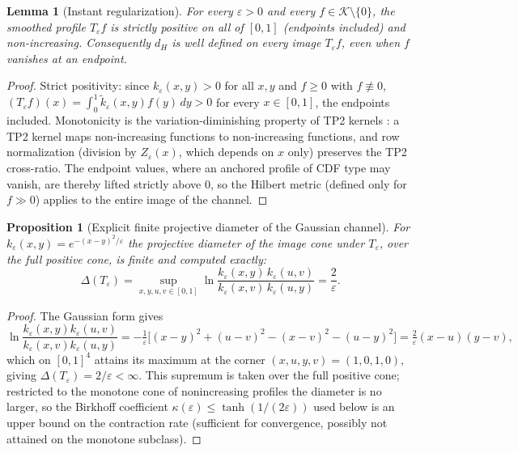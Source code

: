 \documentclass[11pt]{article}
\theoremstyle{plain}
\newtheorem{lemma}[theorem]{Lemma}
\newtheorem{proposition}[theorem]{Proposition}
\theoremstyle{definition}
\theoremstyle{remark}
\begin{document}
\begin{lemma}[Instant regularization]\label{lem:strictpos}
For every $\varepsilon>0$ and every $f\in\mathcal K\setminus\{0\}$, the smoothed profile $T_\varepsilon f$ is strictly positive on all of $[0,1]$ (endpoints included) and non-increasing. Consequently $d_H$ is well defined on every image $T_\varepsilon f$, even when $f$ vanishes at an endpoint.
\end{lemma}
\begin{proof}
Strict positivity: since $k_\varepsilon(x,y)>0$ for all $x,y$ and $f\ge0$ with $f\not\equiv0$, $(T_\varepsilon f)(x)=\int_0^1\tilde k_\varepsilon(x,y)f(y)\,dy>0$ for every $x\in[0,1]$, the endpoints included. Monotonicity is the variation-diminishing property of TP2 kernels \citep{karlin1968}: a TP2 kernel maps non-increasing functions to non-increasing functions, and row normalization (division by $Z_\varepsilon(x)$, which depends on $x$ only) preserves the TP2 cross-ratio. The endpoint values, where an anchored profile of CDF type may vanish, are thereby lifted strictly above $0$, so the Hilbert metric (defined only for $f\gg0$) applies to the entire image of the channel.
\end{proof}

\begin{proposition}[Explicit finite projective diameter of the Gaussian channel]\label{prop:diameter}
For $k_\varepsilon(x,y)=e^{-(x-y)^2/\varepsilon}$ the projective diameter of the image cone under $T_\varepsilon$, over the full positive cone, is finite and computed exactly:
\[
\Delta(T_\varepsilon)=\sup_{x,y,u,v\in[0,1]}\ln\frac{k_\varepsilon(x,y)\,k_\varepsilon(u,v)}{k_\varepsilon(x,v)\,k_\varepsilon(u,y)}=\frac{2}{\varepsilon}.
\]
\end{proposition}
\begin{proof}
The Gaussian form gives
\[
\ln\frac{k_\varepsilon(x,y)k_\varepsilon(u,v)}{k_\varepsilon(x,v)k_\varepsilon(u,y)}
=-\tfrac1\varepsilon\big[(x-y)^2+(u-v)^2-(x-v)^2-(u-y)^2\big]
=\tfrac2\varepsilon(x-u)(y-v),
\]
which on $[0,1]^4$ attains its maximum at the corner $(x,u,y,v)=(1,0,1,0)$, giving $\Delta(T_\varepsilon)=2/\varepsilon<\infty$. This supremum is taken over the full positive cone; restricted to the monotone cone of nonincreasing profiles the diameter is no larger, so the Birkhoff coefficient $\kappa(\varepsilon)\le\tanh(1/(2\varepsilon))$ used below is an upper bound on the contraction rate (sufficient for convergence, possibly not attained on the monotone subclass).
\end{proof}
\end{document}
